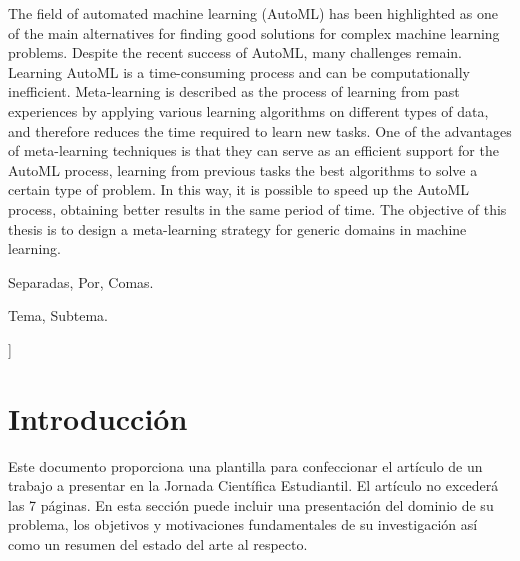 \documentclass[a4paper,10pt,twocolumn]{article}
\begin{document}
\begin{enabstract}
	The field of automated machine learning (AutoML) has been highlighted as one of the main alternatives for finding good solutions for complex machine learning problems. Despite the recent success of AutoML, many challenges remain. Learning AutoML is a time-consuming process and can be computationally inefficient. Meta-learning is described as the process of learning from past experiences by applying various learning algorithms on different types of data, and therefore reduces the time required to learn new tasks. One of the advantages of meta-learning techniques is that they can serve as an efficient support for the AutoML process, learning from previous tasks the best algorithms to solve a certain type of problem. In this way, it is possible to speed up the AutoML process, obtaining better results in the same period of time. The objective of this thesis is to design a meta-learning strategy for generic domains in machine learning.

\end{enabstract}

\begin{keywords}
	Separadas,
	Por,
	Comas.
\end{keywords}

\begin{topics}
	Tema, Subtema.
\end{topics}


\vspace{0.8cm}
]



\section{Introducción}\label{sec:intro}
  Este documento proporciona una plantilla para confeccionar el artículo de un 
  trabajo a presentar en la Jornada Científica Estudiantil. El artículo no excederá 
  las 7 páginas. En esta sección puede incluir una presentación del dominio de su 
  problema, los objetivos y motivaciones fundamentales de su investigación así como 
  un resumen del estado del arte al respecto.
\end{document}
